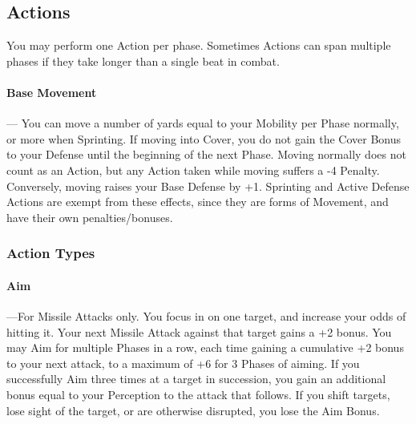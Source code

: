 \documentclass[oneside,11pt,english]{book}
\begin{document}
\subsection{Actions}
You may perform one Action per phase. Sometimes Actions can span multiple phases if they take longer
than a single beat in combat.

\paragraph{Base Movement}---\quad 
You can move a number of yards equal to your Mobility per Phase normally, or more
when Sprinting. If moving into Cover, you do not gain the Cover Bonus to your Defense until the
beginning of the next Phase.
Moving normally does not count as an Action, but any Action taken while moving suffers a -4 Penalty.
Conversely, moving raises your Base Defense by +1. Sprinting and Active Defense Actions are exempt
from these effects, since they are forms of Movement, and have their own penalties/bonuses.
\subsubsection{Action Types}
\paragraph{Aim}---\quad For Missile Attacks only. You focus in on one target, and increase your odds of hitting it. Your next
Missile Attack against that target gains a +2 bonus. You may Aim for multiple Phases in a row, each time
gaining a cumulative +2 bonus to your next attack, to a maximum of +6 for 3 Phases of aiming. If you
successfully Aim three times at a target in succession, you gain an additional bonus equal to your
Perception to the attack that follows. If you shift targets, lose sight of the target, or are otherwise
disrupted, you lose the Aim Bonus.
\end{document}
